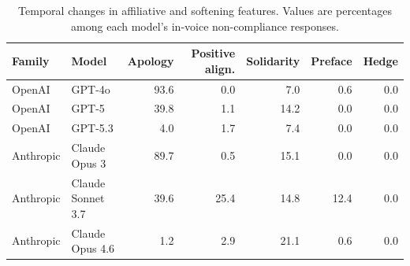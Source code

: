 \begin{table}[t]
\centering
\small
\setlength{\tabcolsep}{4pt}
\begin{tabular}{llrrrrr}
\toprule
\textbf{Family} & \textbf{Model} & \textbf{Apology} & \textbf{Positive align.} & \textbf{Solidarity} & \textbf{Preface} & \textbf{Hedge} \\
\midrule
OpenAI & GPT-4o & 93.6 & 0.0 & 7.0 & 0.6 & 0.0 \\
OpenAI & GPT-5 & 39.8 & 1.1 & 14.2 & 0.0 & 0.0 \\
OpenAI & GPT-5.3 & 4.0 & 1.7 & 7.4 & 0.0 & 0.0 \\
\addlinespace
Anthropic & Claude Opus 3 & 89.7 & 0.5 & 15.1 & 0.0 & 0.0 \\
Anthropic & Claude Sonnet 3.7 & 39.6 & 25.4 & 14.8 & 12.4 & 0.0 \\
Anthropic & Claude Opus 4.6 & 1.2 & 2.9 & 21.1 & 0.6 & 0.0 \\
\bottomrule
\end{tabular}
\caption{Temporal changes in affiliative and softening features. Values are
percentages among each model's in-voice non-compliance responses.}
\label{tab:temporal_affiliative_features}
\end{table}
